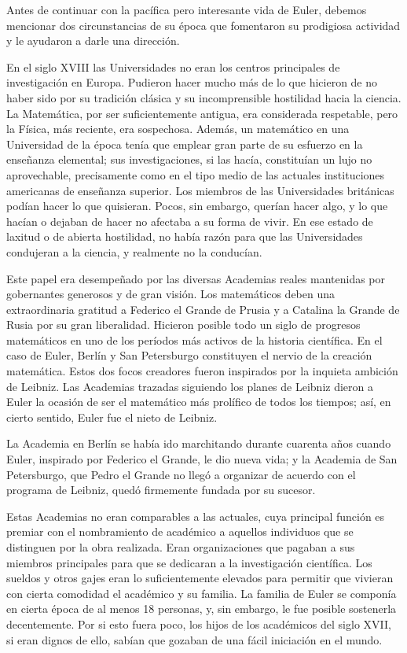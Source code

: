 \documentclass[a4paper, 12pt]{article}
\begin{document}
Antes de continuar con la pacífica pero interesante vida de Euler, debemos mencionar dos circunstancias de su época que fomentaron su prodigiosa actividad y le ayudaron a darle una dirección.

En el siglo XVIII las Universidades no eran los centros principales de investigación en Europa. Pudieron hacer mucho más de lo que hicieron de no haber sido por su tradición clásica y su incomprensible hostilidad hacia la ciencia. La Matemática, por  ser suficientemente antigua, era considerada respetable, pero la Física, más reciente, era sospechosa. Además, un matemático en una Universidad de la época tenía que emplear gran parte de su esfuerzo en la enseñanza elemental; sus investigaciones, si las hacía, constituían un lujo no aprovechable, precisamente como en el tipo medio de las actuales instituciones americanas de enseñanza superior. Los miembros de las Universidades británicas podían hacer lo que quisieran. Pocos, sin embargo, querían hacer algo, y lo que hacían o dejaban de hacer no afectaba a su forma de vivir. En ese estado de laxitud o de abierta hostilidad, no había razón para que las Universidades condujeran a la ciencia, y realmente no la conducían.

Este papel era desempeñado por las diversas Academias reales mantenidas por gobernantes generosos y de gran visión. Los matemáticos deben una extraordinaria gratitud a Federico el Grande de Prusia y a Catalina la Grande de Rusia por su gran liberalidad. Hicieron posible todo un siglo de progresos matemáticos en uno de los períodos más activos de la historia científica. En el caso de Euler, Berlín y San Petersburgo constituyen el nervio de la creación matemática. Estos dos focos creadores fueron inspirados por la inquieta ambición de Leibniz. Las Academias trazadas siguiendo los planes de Leibniz dieron a Euler la ocasión de ser el matemático más prolífico de todos los tiempos; así, en cierto sentido, Euler fue el nieto de Leibniz.

La Academia en Berlín se había ido marchitando durante cuarenta años cuando Euler, inspirado por Federico el Grande, le dio nueva vida; y la Academia de San Petersburgo, que Pedro el Grande no llegó a organizar de acuerdo con el programa de Leibniz, quedó firmemente fundada por su sucesor.

Estas Academias no eran comparables a las actuales, cuya principal función es premiar con el nombramiento de académico a aquellos individuos que se distinguen por la obra realizada. Eran organizaciones que pagaban a sus miembros principales para que se dedicaran a la investigación científica. Los sueldos y otros gajes eran lo suficientemente elevados para permitir que vivieran con cierta comodidad el académico y su familia. La familia de Euler se componía en cierta época de al menos 18 personas, y, sin embargo, le fue posible sostenerla decentemente. Por si esto fuera poco, los hijos de los académicos del siglo XVII, si eran dignos de ello, sabían que gozaban de una fácil iniciación en el mundo.
\end{document}
